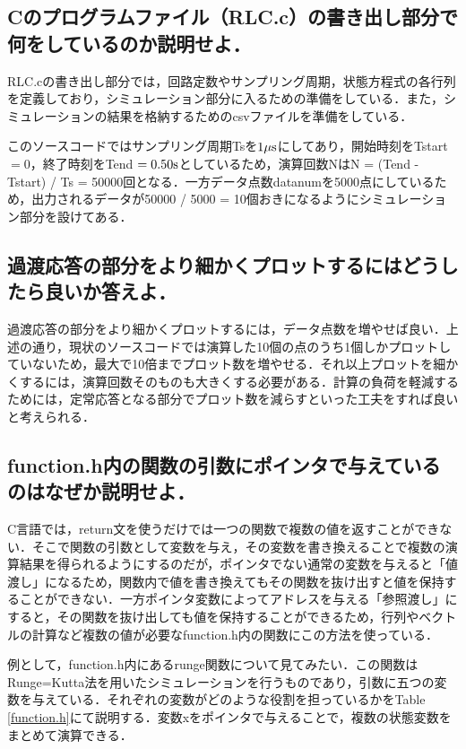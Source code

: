 \documentclass[a4paper,10pt,twocolumn,fleqn]{jarticle}
\begin{document}
  \subsection{Cのプログラムファイル（RLC.c）の書き出し部分で何をしているのか説明せよ．}
    RLC.cの書き出し部分では，回路定数やサンプリング周期，状態方程式の各行列を定義しており，シミュレーション部分に入るための準備をしている．また，シミュレーションの結果を格納するためのcsvファイルを準備をしている．

    このソースコードではサンプリング周期Tsを$1{\rm \mu s}$にしてあり，開始時刻をTstart $ = 0$，終了時刻をTend $= 0.50{\rm s}$としているため，演算回数NはN = (Tend - Tstart) / Ts = 50000回となる．一方データ点数datanumを5000点にしているため，出力されるデータが50000 / 5000 = 10個おきになるようにシミュレーション部分を設けてある．

  \subsection{過渡応答の部分をより細かくプロットするにはどうしたら良いか答えよ．}
    過渡応答の部分をより細かくプロットするには，データ点数を増やせば良い．上述の通り，現状のソースコードでは演算した10個の点のうち1個しかプロットしていないため，最大で10倍までプロット数を増やせる．それ以上プロットを細かくするには，演算回数そのものも大きくする必要がある．計算の負荷を軽減するためには，定常応答となる部分でプロット数を減らすといった工夫をすれば良いと考えられる．

  \subsection{function.h内の関数の引数にポインタで与えているのはなぜか説明せよ．}


  C言語では，return文を使うだけでは一つの関数で複数の値を返すことができない．そこで関数の引数として変数を与え，その変数を書き換えることで複数の演算結果を得られるようにするのだが，ポインタでない通常の変数を与えると「値渡し」になるため，関数内で値を書き換えてもその関数を抜け出すと値を保持することができない．一方ポインタ変数によってアドレスを与える「参照渡し」にすると，その関数を抜け出しても値を保持することができるため，行列やベクトルの計算など複数の値が必要なfunction.h内の関数にこの方法を使っている．

  例として，function.h内にあるrunge関数について見てみたい．この関数はRunge=Kutta法を用いたシミュレーションを行うものであり，引数に五つの変数を与えている．それぞれの変数がどのような役割を担っているかをTable \ref{function.h}にて説明する．変数xをポインタで与えることで，複数の状態変数をまとめて演算できる．
\end{document}
